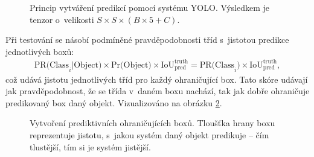 \begin{figure}[H]
    \centering
    \caption{Princip vytváření predikcí pomocí systému YOLO. Výsledkem je tenzor o~velikosti $S\times S\times(B\times 5 + C)$.\footnotemark}
    \label{fig:YOLO_1}
\end{figure}


Při testování se násobí podmíněné pravděpodobnosti tříd s~jistotou predikce jednotlivých boxů:
\begin{align}
    \label{eq:yolo}
    \text{PR(Class}_{i}\text{|Object)} \times \text{Pr(Object)} \times \text{IoU}_{\text{pred}}^\text{truth} = \text{PR(Class}_{i}\text{)} \times \text{IoU}_{\text{pred}}^\text{truth},
\end{align}
což udává jistotu jednotlivých tříd pro každý ohraničující box. Tato skóre udávají jak pravděpodobnost, že se třída v~daném boxu nachází, tak jak dobře ohraničuje predikovaný box daný objekt. Vizualizováno na obrázku \ref{fig:YOLO_2}.

\begin{figure}[H]
    \centering
    \caption{Vytvoření prediktivních ohraničujících boxů. Tloušťka hrany boxu reprezentuje jistotu, s~jakou systém daný objekt predikuje -- čím tlustější, tím si je systém jistější.\footnotemark}
    \label{fig:YOLO_2}
\end{figure}

